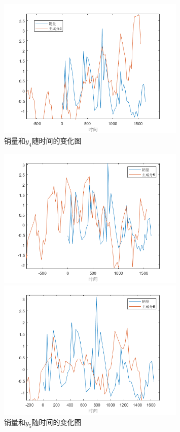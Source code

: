 \documentclass{cumcm}
\begin{document}
\begin{enumerate}
\begin{figure}[H]
\begin{minipage}[t]{0.5\linewidth}
			\includegraphics[width=0.8\textwidth]{img_backup/pca4-sales.png}   
			\caption{销量和$y_4$随时间的变化图}   
			\label{fig:pca4_sales}   
		  \end{minipage} 
	  \end{figure}
	  \begin{figure}[H]
		\begin{minipage}[t]{0.5\linewidth}   
		  \centering   
		  \includegraphics[width=0.8\textwidth]{img_backup/pca5-sales.png}   
		  \caption{销量和$y_5$随时间的变化图}   
		  \label{fig:pca5_sales}   
		\end{minipage}   
		 \begin{minipage}[t]{0.5\linewidth} %
			\centering   
			\includegraphics[width=0.8\textwidth]{img_backup/pca6-sales.png}   

\end{minipage}
\end{figure}
\end{enumerate}
\end{document}
